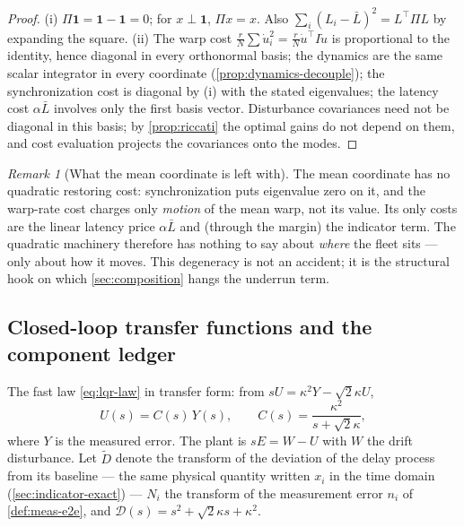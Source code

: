 \documentclass[11pt, a4paper]{article}
\theoremstyle{definition}
\theoremstyle{plain}
\theoremstyle{remark}
\newtheorem{remark}{Remark}[section]
\newcommand{\Lbar}{\bar{L}}
\begin{document}
\begin{proof}
(i) $\Pi\mathbf{1} = \mathbf{1} - \mathbf{1} = 0$; for $x \perp
\mathbf{1}$, $\Pi x = x$.  Also
$\sum_i (L_i - \Lbar)^2 = L^\top \Pi L$ by expanding the square.
(ii) The warp cost $\tfrac{r}{N}\sum \dot u_i^2 = \tfrac{r}{N}
\dot u^\top I \dot u$ is proportional to the identity, hence diagonal in
every orthonormal basis; the dynamics are the same scalar integrator in
every coordinate (\cref{prop:dynamics-decouple}); the synchronization
cost is diagonal by (i) with the stated eigenvalues; the latency cost
$\alpha\Lbar$ involves only the first basis vector.  Disturbance
covariances need not be diagonal in this basis; by
\cref{prop:riccati} the optimal gains do not depend on them, and cost
evaluation projects the covariances onto the modes.
\end{proof}

\begin{remark}[What the mean coordinate is left with]
\label{rem:mean-coordinate}
The mean coordinate has no quadratic restoring cost: synchronization
puts eigenvalue zero on it, and the warp-rate cost charges only
\emph{motion} of the mean warp, not its value.  Its only costs are the
linear latency price $\alpha\Lbar$ and (through the margin) the
indicator term.  The quadratic machinery therefore has nothing to say
about \emph{where} the fleet sits --- only about how it moves.  This
degeneracy is not an accident; it is the structural hook on which
\cref{sec:composition} hangs the underrun term.
\end{remark}

\subsection{Closed-loop transfer functions and the component ledger}
\label{sec:transfer}

The fast law \cref{eq:lqr-law} in transfer form: from $s U = \kappa^2 Y
- \sqrt2\kappa U$,
\begin{equation}\label{eq:controller-tf}
  U(s) = C(s)\, Y(s),
  \qquad
  C(s) = \frac{\kappa^2}{s + \sqrt2\kappa},
\end{equation}
where $Y$ is the measured error.  The plant is $sE = W - U$ with $W$ the
drift disturbance.  Let $\tilde D$ denote the transform of the
deviation of the delay process from its baseline --- the same physical
quantity written $x_i$ in the time domain
(\cref{sec:indicator-exact}) --- $N_i$ the transform of the
measurement error $n_i$ of \cref{def:meas-e2e}, and
$\mathcal{D}(s) = s^2 + \sqrt2\kappa s + \kappa^2$.
\end{document}
